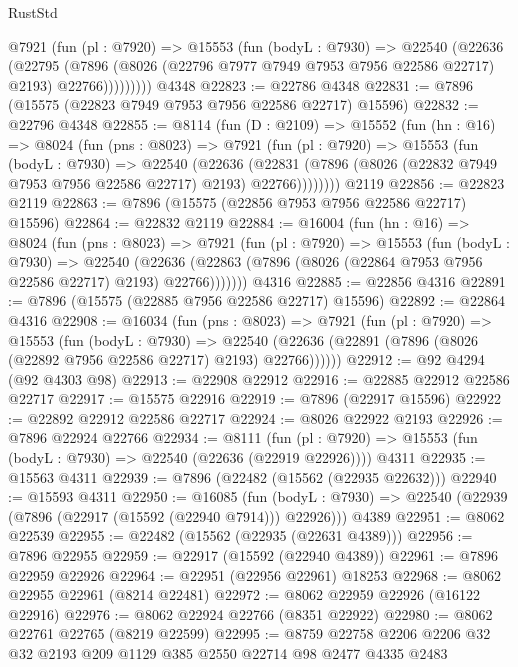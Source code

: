 \begin{lexlean}{RustStd}
\begin{coremodule}
          @7921
            (fun (pl : @7920) =>
            @15553
              (fun (bodyL : @7930) =>
              @22540
                (@22636
                  (@22795
                    (@7896
                      (@8026 (@22796 @7977 @7949 @7953 @7956 @22586 @22717) @2193)
                      @22766)))))))))
    @4348
@22823 := @22786 @4348
@22831 := @7896 (@15575 (@22823 @7949 @7953 @7956 @22586 @22717) @15596)
@22832 := @22796 @4348
@22855 := @8114
    (fun (D : @2109) =>
    @15552
      (fun (hn : @16) =>
      @8024
        (fun (pns : @8023) =>
        @7921
          (fun (pl : @7920) =>
          @15553
            (fun (bodyL : @7930) =>
            @22540
              (@22636
                (@22831 (@7896 (@8026 (@22832 @7949 @7953 @7956 @22586 @22717) @2193) @22766))))))))
    @2119
@22856 := @22823 @2119
@22863 := @7896 (@15575 (@22856 @7953 @7956 @22586 @22717) @15596)
@22864 := @22832 @2119
@22884 := @16004
    (fun (hn : @16) =>
    @8024
      (fun (pns : @8023) =>
      @7921
        (fun (pl : @7920) =>
        @15553
          (fun (bodyL : @7930) =>
          @22540
            (@22636 (@22863 (@7896 (@8026 (@22864 @7953 @7956 @22586 @22717) @2193) @22766)))))))
    @4316
@22885 := @22856 @4316
@22891 := @7896 (@15575 (@22885 @7956 @22586 @22717) @15596)
@22892 := @22864 @4316
@22908 := @16034
    (fun (pns : @8023) =>
    @7921
      (fun (pl : @7920) =>
      @15553
        (fun (bodyL : @7930) =>
        @22540 (@22636 (@22891 (@7896 (@8026 (@22892 @7956 @22586 @22717) @2193) @22766))))))
@22912 := @92 @4294 (@92 @4303 @98)
@22913 := @22908 @22912
@22916 := @22885 @22912 @22586 @22717
@22917 := @15575 @22916
@22919 := @7896 (@22917 @15596)
@22922 := @22892 @22912 @22586 @22717
@22924 := @8026 @22922 @2193
@22926 := @7896 @22924 @22766
@22934 := @8111
    (fun (pl : @7920) => @15553 (fun (bodyL : @7930) => @22540 (@22636 (@22919 @22926))))
    @4311
@22935 := @15563 @4311
@22939 := @7896 (@22482 (@15562 (@22935 @22632)))
@22940 := @15593 @4311
@22950 := @16085
    (fun (bodyL : @7930) => @22540 (@22939 (@7896 (@22917 (@15592 (@22940 @7914))) @22926)))
    @4389
@22951 := @8062 @22539
@22955 := @22482 (@15562 (@22935 (@22631 @4389)))
@22956 := @7896 @22955
@22959 := @22917 (@15592 (@22940 @4389))
@22961 := @7896 @22959 @22926
@22964 := @22951 (@22956 @22961) @18253
@22968 := @8062 @22955 @22961 (@8214 @22481)
@22972 := @8062 @22959 @22926 (@16122 @22916)
@22976 := @8062 @22924 @22766 (@8351 @22922)
@22980 := @8062 @22761 @22765 (@8219 @22599)
@22995 := @8759 @22758 @2206 @2206 @32 @32 @2193 @209 @1129 @385 @2550 @22714 @98 @2477 @4335 @2483

\end{coremodule}
\end{lexlean}
